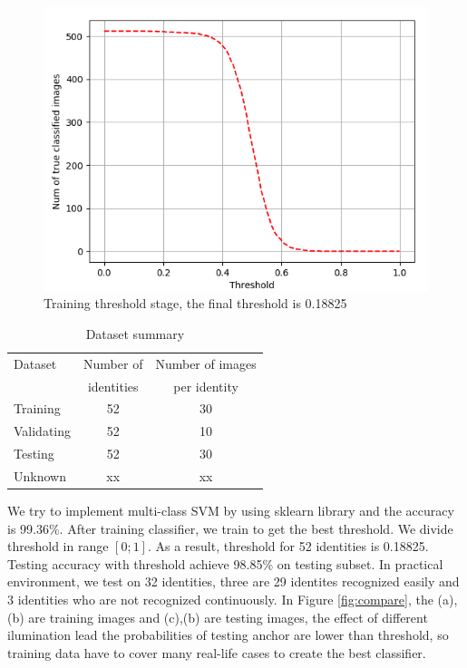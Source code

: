 \documentclass[journal, twocolumn]{IEEEtran}
\begin{document}
\begin{figure}
    \centering
    \includegraphics[width=1\linewidth]{img/thres.png}
	\caption{Training threshold stage, the final threshold is 0.18825}\label{fig:thres}
\end{figure}


\begin{table}
\centering
	\caption{Dataset summary}
	\label{table:dataset}
		\begin{tabularx}{0.65\linewidth}{lcc}
		\toprule
		Dataset      &   Number of  &  Number of images  \\ 
		~            &  identities  &  per identity  \\
		\midrule
		Training     &   52  &  30  \\ 
		Validating   &   52  &  10  \\ 
		Testing      &   52  &  30  \\ 
		Unknown      &   xx  &  xx  \\ 
		\bottomrule
	\end{tabularx}
\end{table}

We try to implement multi-class SVM by using sklearn library and the accuracy is 99.36\%. After training classifier, we train to get the best threshold. We divide threshold in range $[0;1]$. As a result, threshold for 52 identities is 0.18825. Testing accuracy with threshold achieve 98.85\% on testing subset. In practical environment, we test on 32 identities, three are 29 identites recognized easily and 3 identities who are not recognized continuously. In Figure \ref{fig:compare}, the (a),(b) are training images and (c),(b) are testing images, the effect of different ilumination lead the probabilities of testing anchor are lower than threshold, so training data have to cover many real-life cases to create the best classifier.  
\end{document}
